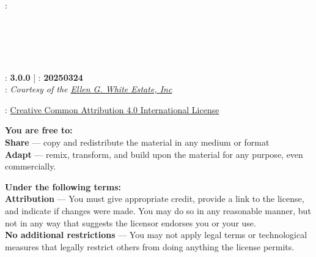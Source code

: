 \clearpage %

{\small
\setlength{\parindent}{0em}\setlength{\parskip}{1em}

{\large \emcap{\booktitle}}

: \textbf{\authorname} \\
\ifx\editor\undefined\else\if\relax\detokenize\expandafter{\editor}\relax{} \\ \fi\fi
\ifx\translatedby\undefined\else\if\relax\detokenize\expandafter{\translatedby}\relax{} \\ \fi\fi
\ifx\publisher\undefined\else\if\relax\detokenize\expandafter{\publisher}\relax{} \\ \fi\fi
\ifx\publishingplace\undefined\else\if\relax\detokenize\expandafter{\publishingplace}\relax{} \\ \fi\fi
\ifx\isbn\undefined\else\if\relax\detokenize\expandafter{\isbn}\relax{} \\ \fi\fi
{}: \textbf{3.0.0} | : \textbf{20250324} \\
: \textit{Courtesy of the \href{https://ellenwhite.org/}{Ellen G. White Estate, Inc}}

\vfill

: \ifepub\else\ccby{}\fi \href{https://creativecommons.org/licenses/by/4.0/}{Creative Common Attribution 4.0 International License}

\textbf{You are free to:} \\
\textbf{Share} — copy and redistribute the material in any medium or format \\
\textbf{Adapt} — remix, transform, and build upon the material for any purpose, even commercially.

\textbf{Under the following terms:} \\
\textbf{Attribution} — You must give appropriate credit, provide a link to the license, and indicate if changes were made. You may do so in any reasonable manner, but not in any way that suggests the licensor endorses you or your use. \\
\textbf{No additional restrictions} — You may not apply legal terms or technological measures that legally restrict others from doing anything the license permits.

}
